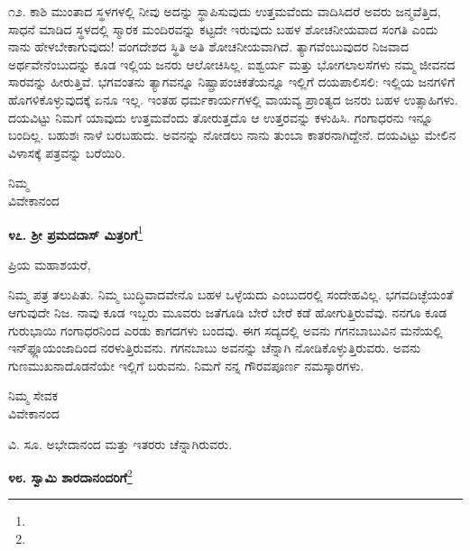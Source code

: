 ೧೨. ಕಾಶಿ ಮುಂತಾದ ಸ್ಥಳಗಳಲ್ಲಿ ನೀವು ಅದನ್ನು ಸ್ಥಾಪಿಸುವುದು ಉತ್ತಮವೆಂದು ವಾದಿಸಿದರೆ \enginline{-} ಅವರು ಜನ್ಮವೆತ್ತಿದ, ಸಾಧನೆ ಮಾಡಿದ ಸ್ಥಳದಲ್ಲಿ ಸ್ಮಾರಕ ಮಂದಿರವನ್ನು ಕಟ್ಟದೇ ಇರುವುದು ಬಹಳ ಶೋಚನೀಯವಾದ ಸಂಗತಿ ಎಂದು ನಾನು ಹೇಳಬೇಕಾಗುವುದು! ವಂಗದೇಶದ ಸ್ಥಿತಿ ಅತಿ ಶೋಚನೀಯವಾಗಿದೆ. ತ್ಯಾಗವೆಂಬುವುದರ ನಿಜವಾದ ಅರ್ಥವೇನೆಂಬುದನ್ನು ಕೂಡ ಇಲ್ಲಿಯ ಜನರು ಆಲೋಚಿಸಿಲ್ಲ. ಐಶ್ವರ್ಯ ಮತ್ತು ಭೋಗಲಾಲಸೆಗಳು ನಮ್ಮ ಜೀವನದ ಸಾರವನ್ನು ಹೀರುತ್ತಿವೆ. ಭಗವಂತನು ತ್ಯಾಗವನ್ನೂ ನಿಷ್ಪ್ರಾಪಂಚಿಕತೆಯನ್ನೂ ಇಲ್ಲಿಗೆ ದಯಪಾಲಿಸಲಿ: ಇಲ್ಲಿಯ ಜನಗಳಿಗೆ ಹೊಗಳಿಕೊಳ್ಳುವುದಕ್ಕೆ ಏನೂ ಇಲ್ಲ. ಇಂತಹ ಧರ್ಮಕಾರ್ಯಗಳಲ್ಲಿ ವಾಯವ್ಯ ಪ್ರಾಂತ್ಯದ ಜನರು ಬಹಳ ಉತ್ಸಾಹಿಗಳು. ದಯವಿಟ್ಟು ನಿಮಗೆ ಯಾವುದು ಉತ್ತಮವೆಂದು ತೋರುತ್ತದೊ ಆ ಉತ್ತರವನ್ನು ಕಳುಹಿಸಿ. ಗಂಗಾಧರನು ಇನ್ನೂ ಬಂದಿಲ್ಲ. ಬಹುಶಃ ನಾಳೆ ಬರಬಹುದು. ಅವನನ್ನು ನೋಡಲು ನಾನು ತುಂಬಾ ಕಾತರನಾಗಿದ್ದೇನೆ. ದಯವಿಟ್ಟು ಮೇಲಿನ ವಿಳಾಸಕ್ಕೆ ಪತ್ರವನ್ನು ಬರೆಯಿರಿ.

\vspace{-0.55cm}

{\flushright
ನಿಮ್ಮ\\ವಿವೇಕಾನಂದ\par}

\begin{center}
\textbf{೪೭. ಶ‍್ರೀ ಪ್ರಮದದಾಸ್ ಮಿತ್ರರಿಗೆ}\footnote{}
\end{center}

\vspace{-0.5cm}

\begin{flushright}
{\fontsize{11pt}{11pt}\selectfont{ಬಾಗ್‌ಬಜಾರ್\\[-2pt] ೪ನೇ ಜೂನ್ ೧೮೯೦}}
\end{flushright}

\noindent
ಪ್ರಿಯ ಮಹಾಶಯರೆ,

ನಿಮ್ಮ ಪತ್ರ ತಲುಪಿತು. ನಿಮ್ಮ ಬುದ್ಧಿವಾದವೇನೊ ಬಹಳ ಒಳ್ಳೆಯದು ಎಂಬುದರಲ್ಲಿ ಸಂದೇಹವಿಲ್ಲ. ಭಗವದಿಚ್ಛೆಯಂತೆ ಆಗುವುದೇ ನಿಜ. ನಾವು ಕೂಡ ಇಬ್ಬರು ಮೂವರು ಜತೆಗೂಡಿ ಬೇರೆ ಬೇರೆ ಕಡೆ ಹೋಗುತ್ತಿರುವೆವು. ನನಗೂ ಕೂಡ ಗುರುಭಾಯಿ ಗಂಗಾಧರನಿಂದ ಎರಡು ಕಾಗದಗಳು ಬಂದವು. ಈಗ ಸದ್ಯದಲ್ಲಿ ಅವನು ಗಗನಬಾಬುವಿನ ಮನೆಯಲ್ಲಿ ಇನ್‌ಫ್ಲೂಯಂಜಾದಿಂದ ನರಳುತ್ತಿರುವನು. ಗಗನಬಾಬು ಅವನನ್ನು ಚೆನ್ನಾಗಿ ನೋಡಿಕೊಳ್ಳುತ್ತಿರುವರು. ಅವನು ಗುಣಮುಖನಾದೊಡನೆಯೇ ಇಲ್ಲಿಗೆ ಬರುವನು. ನಿಮಗೆ ನನ್ನ ಗೌರವಪೂರ್ಣ ನಮಸ್ಕಾರಗಳು.

\begin{flushright}
ನಿಮ್ಮ ಸೇವಕ\\ವಿವೇಕಾನಂದ
\end{flushright}


ವಿ. ಸೂ. \enginline{-}ಅಭೇದಾನಂದ ಮತ್ತು ಇತರರು ಚೆನ್ನಾಗಿರುವರು.

\vspace{-0.25cm}

\begin{center}
\textbf{೪೮. ಸ್ವಾಮಿ ಶಾರದಾನಂದರಿಗೆ}\footnote{}
\end{center}

